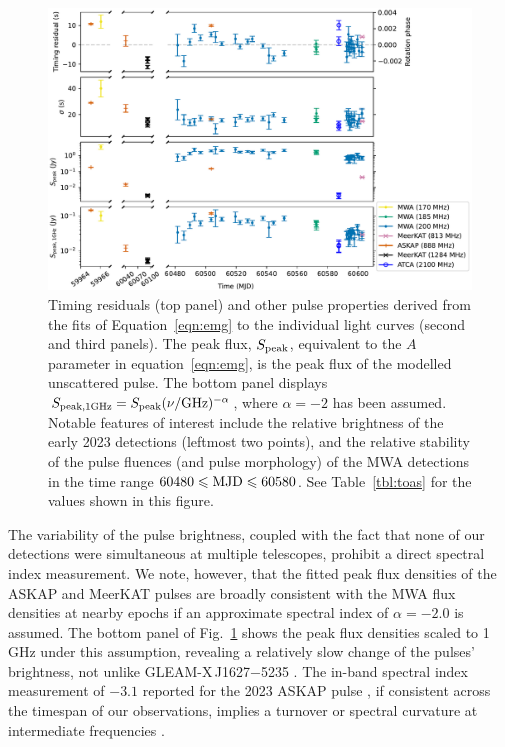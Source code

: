 \documentclass[fleqn,usenatbib]{mnras}
\newcommand{\Fig}{Fig.}
\newcommand{\Tab}{Table}
\newcommand{\eqn}{equation}
\newcommand{\Eqn}{Equation}
\begin{document}
\begin{figure}
  \centering
  \includegraphics[width=0.98\linewidth]{pulse_details.pdf}
  \caption{Timing residuals (top panel) and other pulse properties derived from the fits of \Eqn~\ref{eqn:emg} to the individual light curves (second and third panels). The peak flux, $S_{\rm peak}$, equivalent to the $A$ parameter in \eqn~\ref{eqn:emg}, is the peak flux of the modelled unscattered pulse. The bottom panel displays $S_{\rm peak,1 GHz} = S_{\rm peak} (\nu/{\rm GHz})^{-\alpha}$, where $\alpha = -2$ has been assumed. Notable features of interest include the relative brightness of the early 2023 detections (leftmost two points), and the relative stability of the pulse fluences (and pulse morphology) of the MWA detections in the time range $60480 \le {\rm MJD} \le 60580$. See \Tab~\ref{tbl:toas} for the values shown in this figure.}
  \label{fig:pulse_details}
\end{figure}

The variability of the pulse brightness, coupled with the fact that none of our detections were simultaneous at multiple telescopes, prohibit a direct spectral index measurement.
We note, however, that the fitted peak flux densities of the ASKAP and MeerKAT pulses are broadly consistent with the MWA flux densities at nearby epochs if an approximate spectral index of $\alpha = -2.0$ is assumed.
The bottom panel of \Fig~\ref{fig:pulse_details} shows the peak flux densities scaled to 1\,GHz under this assumption, revealing a relatively slow change of the pulses' brightness, not unlike GLEAM-X\,J1627$-$5235 \citep{2022Natur.601..526H}.
The in-band spectral index measurement of $-3.1$ reported for the 2023 ASKAP pulse , if consistent across the timespan of our observations, implies a turnover or spectral curvature at intermediate frequencies \citep[perhaps comparable with GPM\,1839$-$10][]{2023Natur.619..487H}.
\end{document}
